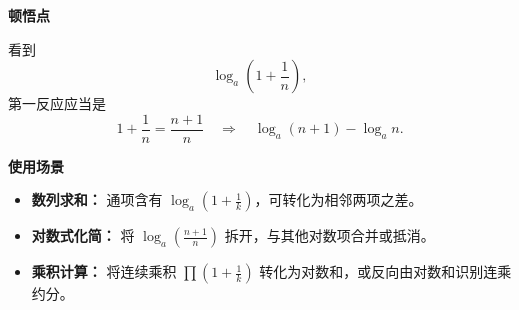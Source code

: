 \begin{explanationbox}
	\medskip
	\textbf{\textcolor{CExplanation}{顿悟点}}

	看到
	\[
		\log_a\!\left(1+\frac{1}{n}\right),
	\]
	第一反应应当是
	\[
		1+\frac{1}{n}=\frac{n+1}{n}
		\quad\Longrightarrow\quad
		\log_a(n+1)-\log_a n.
	\]

	\medskip
	\textbf{\textcolor{CExplanation}{使用场景}}
	\begin{itemize}[leftmargin=*, itemsep=0.5em, topsep=0.4em]
		\item \textbf{数列求和：} 通项含有 \(\log_a\!\left(1+\frac{1}{k}\right)\)，可转化为相邻两项之差。
		\item \textbf{对数式化简：} 将 \(\log_a\!\left(\frac{n+1}{n}\right)\) 拆开，与其他对数项合并或抵消。
		\item \textbf{乘积计算：} 将连续乘积 \(\prod\left(1+\frac{1}{k}\right)\) 转化为对数和，或反向由对数和识别连乘约分。
	\end{itemize}
\end{explanationbox}